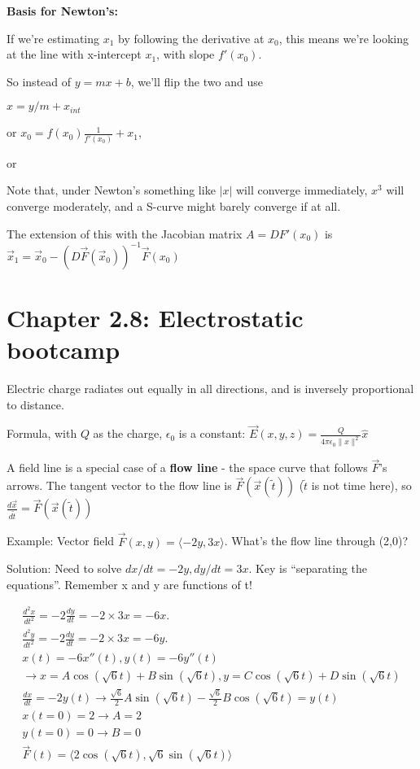 \documentclass[11pt, oneside]{article}   	%
\begin{document}
\textbf{Basis for Newton's:}

If we're estimating $x_1$ by following the derivative at $x_0$, this means we're looking at the line with x-intercept $x_1$, with slope $f'(x_0)$.

  So instead of $y = mx+b$, we'll flip the two and use 
  
 $x = y/m + x_{int}$ 
 
or $x_0 = f(x_0)\frac{1}{f'(x_0)} + x_1$, 

or 

Note that, under Newton's something like $|x|$ will converge immediately, $x^3$ will converge moderately, and a S-curve might barely converge if at all.

The extension of this with the Jacobian matrix $A = DF'(x_0)$ is $\vec{x}_1 = \vec{x}_0 - (D\vec{F}(\vec{x}_0))^{-1}\vec{F}(x_0)$ 


\section{Chapter 2.8: Electrostatic bootcamp}

Electric charge radiates out equally in all directions, and is inversely proportional to distance.  

Formula, with $Q$ as the charge, $\epsilon_0$ is a constant: $\vec{E}(x,y,z) = \frac{Q}{4\pi\epsilon_0\|x\|^2}\hat{x}$

A field line is a special case of a \textbf{flow line} - the space curve that follows $\vec{F}$'s arrows.  The tangent vector to the flow line is $\vec{F}(\vec{x}(\tilde{t}))$ ($\tilde{t}$ is not time here), so $\frac{d\vec{x}}{d\tilde{t}} = \vec{F}(\vec{x}(\tilde{t}))$

Example: Vector field $\vec{F}(x,y) = \langle -2y, 3x \rangle$.  What's the flow line through (2,0)?

Solution: Need to solve 
$dx/dt = -2y, dy/dt = 3x$.  Key is ``separating the equations''.  Remember x and y are functions of t!

\begin{align}
\frac{d^2x}{dt^2} = -2 \frac{dy}{dt}= -2 \times 3x = -6x.\\
\frac{d^2y}{dt^2} = -2 \frac{dy}{dt}= -2 \times 3x = -6y.\\
x(t) = -6x''(t), y(t) = -6y''(t) \\
\rightarrow x = A\cos(\sqrt{6}t)+ B\sin(\sqrt{6}t),  y = C\cos(\sqrt{6}t)+ D\sin(\sqrt{6}t) \\
\frac{dx}{dt} = -2y(t) \rightarrow   \frac{\sqrt{6}}{2}A\sin(\sqrt{6}t)- \frac{\sqrt{6}}{2}B\cos(\sqrt{6}t)  = y(t) \\
x(t=0) = 2 \rightarrow A = 2 \\
y(t=0) = 0 \rightarrow B = 0 \\
\vec{F}(t) = \langle 2\cos(\sqrt{6}t), \sqrt{6}\sin(\sqrt{6}t) \rangle \\
\end{align}
\end{document}
